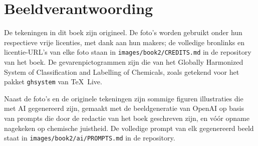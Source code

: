 \chapter*{Beeldverantwoording}

De tekeningen in dit boek zijn origineel. De foto's worden gebruikt onder
hun respectieve vrije licenties, met dank aan hun makers; de volledige
bronlinks en licentie-URL's van elke foto staan in
\texttt{images/book2/CREDITS.md} in de repository van het boek.
De gevarenpictogrammen zijn die van het Globally Harmonized System of
Classification and Labelling of Chemicals, zoals getekend voor het pakket
\texttt{ghsystem} van \TeX\ Live.

\bigskip
Naast de foto's en de originele tekeningen zijn sommige figuren
illustraties die met AI gegenereerd zijn, gemaakt met de beeldgeneratie
van OpenAI op basis van prompts die door de redactie van het boek
geschreven zijn, en vóór opname nagekeken op chemische juistheid. De
volledige prompt van elk gegenereerd beeld staat in
\texttt{images/book2/ai/PROMPTS.md} in de repository.

